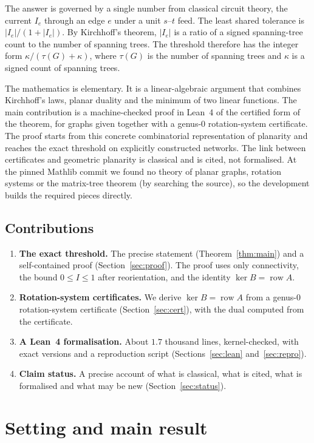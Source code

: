 \documentclass[11pt]{amsart}
\theoremstyle{plain}
\theoremstyle{definition}
\theoremstyle{remark}
\newcommand{\row}{\operatorname{row}}
\begin{document}
The answer is governed by a single number from classical circuit theory, the current $I_e$ through an edge $e$
under a unit $s$--$t$ feed. The least shared tolerance is $|I_e|/(1+|I_e|)$. By Kirchhoff's theorem, $|I_e|$ is a
ratio of a signed spanning-tree count to the number of spanning trees. The threshold therefore has the integer
form $\kappa/(\tau(G)+\kappa)$, where $\tau(G)$ is the number of spanning trees and $\kappa$ is a signed count of
spanning trees.

The mathematics is elementary. It is a linear-algebraic argument that combines Kirchhoff's laws, planar duality
and the minimum of two linear functions. The main contribution is a machine-checked proof in Lean~4 of the certified form of
the theorem, for graphs given together with a genus-$0$ rotation-system certificate. The proof starts from this
concrete combinatorial representation of planarity and reaches the exact threshold on explicitly constructed
networks. The link between certificates and geometric planarity is classical and is cited, not formalised. At the
pinned Mathlib commit we found no theory of planar graphs, rotation systems or the matrix-tree theorem (by
searching the source), so the development builds the required pieces directly.

\subsection*{Contributions}
\begin{enumerate}
\item \textbf{The exact threshold.} The precise statement (Theorem~\ref{thm:main}) and a self-contained proof
  (Section~\ref{sec:proof}). The proof uses only connectivity, the bound $0\le I\le 1$ after reorientation, and
  the identity $\ker B=\row A$.
\item \textbf{Rotation-system certificates.} We derive $\ker B=\row A$ from a genus-$0$ rotation-system
  certificate (Section~\ref{sec:cert}), with the dual computed from the certificate.
\item \textbf{A Lean~4 formalisation.} About $1.7$ thousand lines, kernel-checked, with exact versions and a
  reproduction script (Sections~\ref{sec:lean} and~\ref{sec:repro}).
\item \textbf{Claim status.} A precise account of what is classical, what is cited, what is formalised and what may
  be new (Section~\ref{sec:status}).
\end{enumerate}

\section{Setting and main result}\label{sec:setting}
\end{document}
